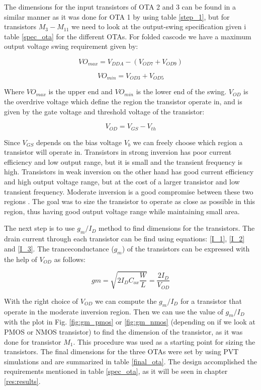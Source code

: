 The dimensions for the input transistors of OTA 2 and 3 can be found in a similar manner as it was done for OTA 1 by using table \ref{step_1}, but for transistors $M_3 - M_{11}$ we need to look at the output-swing specification given i table \ref{spec_ota} for the different OTAs. For folded cascode we have a maximum output voltage swing requirement given by\cite{Razavi}:

\begin{equation}
    VO_{max} = V_{DDA} - (V_{OD7} + V_{OD9})
\end{equation}

\begin{equation}
    VO_{min} = V_{OD3} + V_{OD5}
\end{equation}

Where $VO_{max}$ is the upper end and $VO_{min}$ is the lower end of the swing. $V_{OD}$ is the overdrive voltage which define the region the transistor operate in, and is given by the gate voltage and threshold voltage of the transistor:

\begin{equation}
    V_{OD} = V_{GS} - V_{th}
\end{equation}

Since $V_{GS}$ depends on the bias voltage $V_{b}$ we can freely choose which region a transistor will operate in. Transistors in strong inversion has poor current efficiency and low output range, but it is small and the transient frequency is high. Transistors in weak inversion on the other hand has good current efficiency and high output voltage range, but at the cost of a larger transistor and low transient frequency. Moderate inversion is a good compromise between these two regions \cite{gm_id_2}. The goal was to size the transistor to operate as close as possible in this region, thus having good output voltage range while maintaining small area. 

The next step is to use $g_m/I_D$ method to find dimensions for the transistors. The drain current through each transistor can be find using equations: \ref{I_1}, \ref{I_2} and \ref{I_3}. The tranceconductance ($g_m$) of the transistors can be expressed with the help of $V_{OD}$ as follows:

\begin{equation}
    gm = \sqrt{2I_DC_{ox}\frac{W}{L}} = \frac{2I_D}{V_{OD}}
\end{equation}

With the right choice of $V_{OD}$ we can compute the $g_m/I_D$ for a transistor that operate in the moderate inversion region. Then we can use the value of $g_m/I_D$ with the plot in Fig. \ref{fig:gm_pmos} or \ref{fig:gm_nmos} (depending on if we look at PMOS or NMOS transistor) to find the dimension of the transistor, as it was done for transistor $M_1$. This procedure was used as a starting point for sizing the transistors. The final dimensions for the three OTAs were set by using PVT simulations and are summarized in table \ref{final_ota}. The design accomplished the requirements mentioned in table \ref{spec_ota}, as it will be seen in chapter \ref{res:results}.


